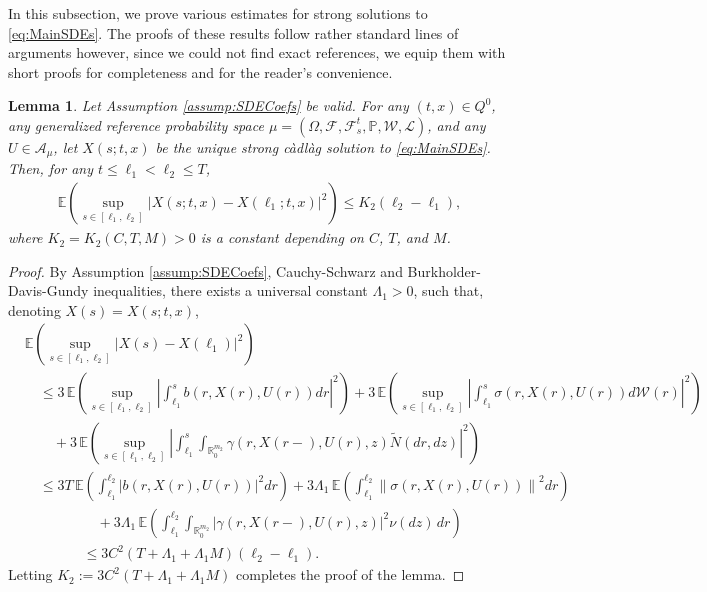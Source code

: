 \documentclass[amscd,amssymb,11pt]{article}
\newtheorem{lemma}[theorem]{Lemma}
\numberwithin{theorem}{section}
\numberwithin{equation}{section}
\begin{document}
In this subsection, we prove various estimates for strong solutions to \eqref{eq:MainSDEs}. The proofs of these results follow
rather standard lines of arguments however, since we could not find exact references, we equip them with short proofs for completeness and for the reader's convenience.
\begin{lemma}\label{lem:2MomentEst}
Let Assumption \ref{assump:SDECoefs} be valid. For any $(t,x)\in Q^{0}$, any generalized reference probability space $\mu=(\Omega,\mathscr{F},\mathscr{F}_{s}^{t},\mathbb{P},\mathcal{W},\mathcal{L})$, and any $U\in\mathcal{A}_{\mu}$, let $X(s;t,x)$ be the unique strong c\`{a}dl\`{a}g solution to \eqref{eq:MainSDEs}. Then, for any $t\leq\ell_{1}<\ell_{2}\leq T$,
\begin{align*}
\mathbb{E}\left(\sup_{s\in[\ell_{1},\ell_{2}]}\left|X(s;t,x)-X(\ell_{1};t,x)\right|^{2}\right)\leq K_{2}\left(\ell_{2}-\ell_{1}\right),
\end{align*}
where $K_{2}=K_{2}(C,T,M)>0$ is a constant depending on $C$, $T$, and $M$.
\end{lemma}
\begin{proof}
By Assumption \ref{assump:SDECoefs}, Cauchy-Schwarz and Burkholder-Davis-Gundy inequalities, there exists a universal constant $\Lambda_{1}>0$, such that, denoting $X(s)=X(s;t,x)$,
\begin{align*}
&\mathbb{E}\left(\sup_{s\in[\ell_{1},\ell_{2}]}\left|X(s)-X(\ell_{1})\right|^{2}\right)\\
&\quad\leq 3\,\mathbb{E}\left(\sup_{s\in[\ell_{1},\ell_{2}]}\left|\int_{\ell_{1}}^{s}b\left(r,X(r),U(r)\right)dr\right|^{2}\right)+3\,\mathbb{E}\left(\sup_{s\in[\ell_{1},\ell_{2}]}\!\left|\int_{\ell_{1}}^{s}\sigma\left(r,X(r),U(r)\right)d\mathcal{W}(r)\right|^{2}\right)\\
&\qquad +3\,\mathbb{E}\left(\sup_{s\in[\ell_{1},\ell_{2}]}\left|\int_{\ell_{1}}^{s}\int_{\mathbb{R}^{m_{2}}_{0}}\gamma\left(r,X(r-),U(r),z\right)\widetilde{N}(dr,dz)\right|^{2}\right)\\
&\quad\leq 3T\,\mathbb{E}\left(\int_{\ell_{1}}^{\ell_{2}}\left|b\left(r,X(r),U(r)\right)\right|^{2}dr\right)+3\Lambda_{1}\,\mathbb{E}\left(\int_{\ell_{1}}^{\ell_{2}}\left\|\sigma\left(r,X(r),U(r)\right)\right\|^{2}dr\right)
\end{align*}
\begin{align*}
&\qquad +3\Lambda_{1}\,\mathbb{E}\left(\int_{\ell_{1}}^{\ell_{2}}\int_{\mathbb{R}_{0}^{m_{2}}}\left|\gamma\left(r,X(r-),U(r),z\right)\right|^{2}\nu(dz)\,dr\right)\\
&\quad\leq 3C^{2}\left(T+\Lambda_{1}+\Lambda_{1}M\right)(\ell_{2}-\ell_{1}).
\end{align*}
Letting $K_{2}:=3C^{2}(T+\Lambda_{1}+\Lambda_{1}M)$ completes the proof of the lemma.
\end{proof}
\end{document}
